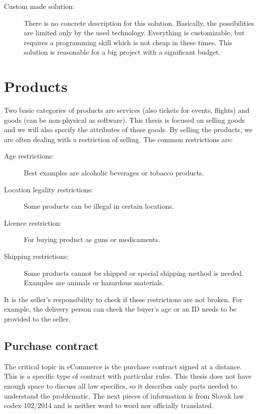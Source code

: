 \documentclass[thesis=M,english]{FITthesis}[2019/12/23]
\begin{document}
\begin{description}
\item[Custom made solution:] 
There is no concrete description for this solution. Basically, the possibilities are limited only by the used technology. Everything is customizable, but requires a programming skill which is not cheap in these times. This solution is reasonable for a big project with a significant budget.

\end{description}


\section{Products}



Two basic categories of products are services (also tickets for events, flights) and goods (can be non-physical as software). This thesis is focused on selling goods and we will also specify the attributes of these goods. 
By selling the products, we are often dealing with a restriction of selling. The common restrictions are:
\begin{description}
\item[Age restrictions:] Best examples are alcoholic beverages or tobacco products.
\item[Location legality restrictions:] Some products can be illegal in certain locations.
\item[Licence restriction:]For buying product as guns or medicaments.
\item[Shipping restrictions:] Some products cannot be shipped or special shipping method is needed. Examples are animals or hazardous materials.
\end{description}
It is the seller's responsibility to check if these restrictions are not broken. For example, the delivery person can check the buyer's age or an ID needs to be provided to the seller.

\label{purchaseContract}
\subsection{Purchase contract}
The critical topic in eCommerce is the purchase contract signed at a distance. This is a specific type of contract with particular rules. This thesis does not have enough space to discuss all law specifics, so it describes only parts needed to understand the problematic. The next pieces of information is from Slovak law codex 102/2014 \cite{customerProtection} and is neither word to word nor officially translated.
\end{document}
